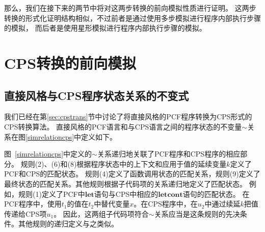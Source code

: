 那么，我们在接下来的两节中将对这两步转换的前向模拟性质进行证明。
这两步转换的形式化证明结构相似，不过前者是通过使用多步模拟进行程序内部执行步骤的模拟，
而后者是使用星形模拟进行程序内部执行步骤的模拟。

\section{CPS转换的前向模拟} \label{sec:cpsforward}

\subsection{直接风格与CPS程序状态关系的不变式}

我们已经在第\ref{sec:cpstrans}节中讨论了将直接风格的PCF程序转换为CPS形式的CPS转换算法。
直接风格的PCF语言和与CPS语言之间的程序状态的不变量$\sim$关系在图\ref{simrelationcps}中定义如下。

图~\ref{simrelationcps}中定义的$\sim$关系递归地关联了PCF程序和CPS程序的相应部分。
规则(2)、(6)和(8)根据程序状态中的上下文和应用于值的延续变量$k$定义了PCF和CPS的匹配状态。
规则(4)定义了函数调用状态的匹配关系，规则(9)定义了最终状态的匹配关系。其他规则根据子代码项的关系递归地定义了匹配状态。
例如，规则(1)定义了PCF中$\mathbf{let}$语句与CPS中相应的$\mathbf{letcont}$语句的匹配状态。
在PCF程序中，使用$t_1$的值在$t_2$中替代变量$x$。在CPS程序中，在$u_2$中通过续延$k$把值传递给CPS项$u_1$。
因此，这两组子代码项符合$\sim$关系应当是这条规则的先决条件。其他规则的递归定义与之类似。

